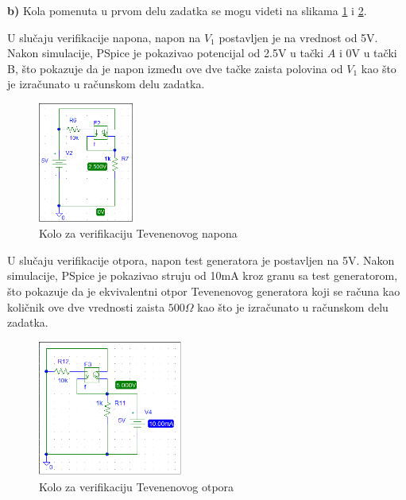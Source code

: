 \documentclass{article}
\begin{document}
    \textbf{b)} Kola pomenuta u prvom delu zadatka se mogu videti na slikama \ref{KoloUt} i \ref{KoloRt}.

    U slučaju verifikacije napona, napon na $V_1$ postavljen je na vrednost od 5V. Nakon simulacije, PSpice je pokazivao potencijal od 2.5V u tački $A$ i 0V u tački B, što pokazuje da je napon između ove dve tačke zaista polovina od $V_1$ kao što je izračunato u računskom delu zadatka.
    \begin{figure}[H]
        \centering
        \includegraphics[width=120px]{KoloZaVerifikacijuTevenenovogNapona.png}
        \caption{Kolo za verifikaciju Tevenenovog napona}
        \label{KoloUt}
    \end{figure}

    U slučaju verifikacije otpora, napon test generatora je postavljen na 5V. Nakon simulacije, PSpice je pokazivao struju od 10mA kroz granu sa test generatorom, što pokazuje da je ekvivalentni otpor Tevenenovog generatora koji se računa kao količnik ove dve vrednosti zaista $500\Omega$ kao što je izračunato u računskom delu zadatka.
    \begin{figure}[H]
        \centering
        \includegraphics[width=180px]{KoloZaVerifikacijuTevenenovogOtpora.png}
        \caption{Kolo za verifikaciju Tevenenovog otpora}
        \label{KoloRt}
    \end{figure}
\end{document}
